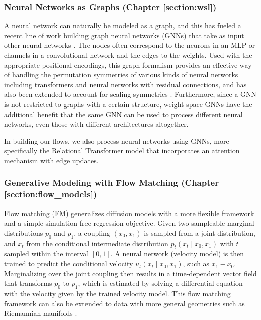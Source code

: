 \subsubsection{Neural Networks as Graphs (Chapter \ref{section:wsl})}

A neural network can naturally be modeled as a graph, and this has fueled a recent line of work building graph neural networks (GNNs) that take as input other neural networks \citep{kofinasGraphNeuralNetworks2024,limGraphMetanetworksProcessing2023,kalogeropoulosScaleEquivariantGraph2024}. The nodes often correspond to the neurons in an MLP or channels in a convolutional network and the edges to the weights. Used with the appropriate positional encodings, this graph formalism provides an effective way of handling the permutation symmetries of various kinds of neural networks including transformers and neural networks with residual connections, and has also been extended to account for scaling symmetries \citep{kalogeropoulosScaleEquivariantGraph2024}. Furthermore, since a GNN is not restricted to graphs with a certain structure, weight-space GNNs have the additional benefit that the same GNN can be used to process different neural networks, even those with different architectures altogether.

In building our flows, we also process neural networks using GNNs, more specifically the Relational Transformer model \citep{diaoRelationalAttentionGeneralizing2023,kofinasGraphNeuralNetworks2024} that incorporates an attention mechanism with edge updates. 

\subsubsection{Generative Modeling with Flow Matching (Chapter \ref{section:flow_models})}

Flow matching (FM) \citep{lipmanFlowMatchingGenerative2023,albergoStochasticInterpolantsUnifying2023,liuFlowStraightFast2022,tongImprovingGeneralizingFlowbased2023} generalizes diffusion models with a more flexible framework and a simple simulation-free regression objective. Given two sampleable marginal distributions $p_0$ and $p_1$, a coupling $(x_0, x_1)$ is sampled from a joint distribution, and $x_t$ from the conditional intermediate distribution $p_t(x_t \mid x_0, x_1)$ with $t$ sampled within the interval $[0,1]$. A neural network (velocity model) is then trained to predict the conditional velocity $u_t(x_t \mid x_0, x_1)$, such as $x_1 - x_0$. Marginalizing over the joint coupling then results in a time-dependent vector field that transforms $p_0$ to $p_1$, which is estimated by solving a differential equation with the velocity given by the trained velocity model. This flow matching framework can also be extended to data with more general geometries such as Riemannian manifolds \citep{chenRiemannianFlowMatching2023}. 

